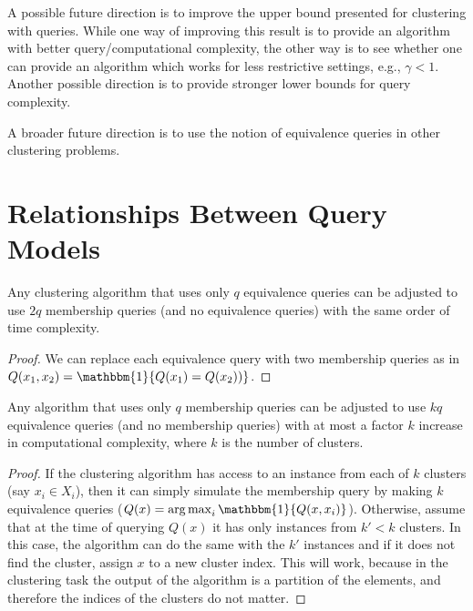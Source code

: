 \documentclass[orivec]{llncs}
\DeclareMathOperator*{\argmax}{arg\,max}
\begin{document}
A possible future direction is to improve the upper bound presented for clustering with queries. While one way of improving this result is to provide an algorithm with better query/computational complexity, the other way is to see whether one can provide an algorithm which works for less restrictive settings, e.g., $\gamma < 1$. Another possible direction is to provide stronger lower bounds for query complexity.

A broader future direction is to use the notion of equivalence queries in other clustering problems.




\appendix
\section{Relationships Between Query Models}
\label{appendix:diffQueryModels}

\begin{proposition}
Any clustering algorithm that uses only $q$ equivalence queries can be adjusted to use $2q$ membership queries (and no equivalence queries) with the same order of time complexity.
\end{proposition}
\begin{proof}
We can replace each equivalence query with two membership queries as in $Q(x_1,x_2)={\mathbbm{1}}\{Q(x_1)=Q(x_2))\}$.
\end{proof}

\begin{proposition}
Any algorithm that uses only $q$ membership queries can be adjusted to use $kq$ equivalence queries (and no membership queries) with at most a factor $k$ increase in computational complexity, where $k$ is the number of clusters.
\end{proposition}
\begin{proof}
If the clustering algorithm has access to an instance from each of $k$ clusters (say $x_i\in X_i$), then it can simply simulate the membership query by making $k$ equivalence queries ($Q(x) = \argmax_{i}\mathbbm{1}\{Q(x, x_i)\}$). Otherwise, assume that at the time of querying $Q(x)$ it has only instances from $k\prime<k$ clusters. In this case, the algorithm can do the same with the $k\prime$ instances and if it does not find the cluster, assign $x$ to a new cluster index. This will work, because in the clustering task the output of the algorithm is a partition of the elements, and therefore the indices of the clusters do not matter.
\end{proof}
\end{document}
